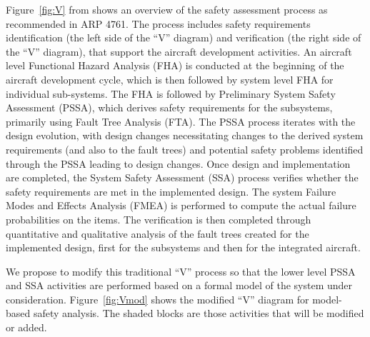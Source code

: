 
Figure~\ref{fig:V} from \cite{Joshi05:SafeComp} shows an overview of the safety assessment
process as recommended in ARP 4761. The process includes safety
requirements identification (the left side of the ``V'' diagram)
and verification (the right side of the ``V'' diagram), that
support the aircraft development activities. An aircraft level
Functional Hazard Analysis (FHA) is conducted at the beginning of
the aircraft development cycle, which is then followed by system
level FHA for individual sub-systems. The FHA is followed by
Preliminary System Safety Assessment (PSSA), which derives safety
requirements for the subsystems, primarily using Fault Tree
Analysis (FTA). The PSSA process iterates with the design
evolution, with design changes necessitating changes to the
derived system requirements (and also to the fault trees) and
potential safety problems identified through the PSSA leading to
design changes. Once design and implementation are completed, the
System Safety Assessment (SSA) process verifies whether the safety
requirements are met in the implemented design. The system Failure
Modes and Effects Analysis (FMEA) is performed to compute the
actual failure probabilities on the items. The verification is
then completed through quantitative and qualitative analysis of
the fault trees created for the implemented design, first for the
subsystems and then for the integrated aircraft.


We propose to modify this traditional ``V'' process so that the
lower level PSSA and SSA activities are performed based on a
formal model of the system under consideration.
Figure~\ref{fig:Vmod} shows the modified ``V'' diagram for
model-based safety analysis. The shaded blocks are those
activities that will be modified or added.

